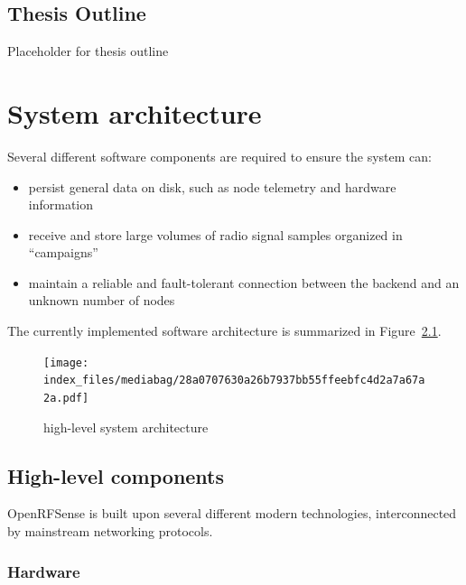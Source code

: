 \documentclass[
  letterpaper,
  a4paper,
  12pt,
  titlepage,
  oneside,
  openany]{book}
\providecommand{\tightlist}{%
  \setlength{\itemsep}{0pt}\setlength{\parskip}{0pt}}\usepackage{longtable,booktabs,array}
\begin{document}
\hypertarget{thesis-outline}{%
\section{Thesis Outline}\label{thesis-outline}}

Placeholder for thesis outline


\hypertarget{system-architecture}{%
\chapter{System architecture}\label{system-architecture}}

Several different software components are required to ensure the system
can:

\begin{itemize}
\tightlist
\item
  persist general data on disk, such as node telemetry and hardware
  information
\item
  receive and store large volumes of radio signal samples organized in
  \enquote{campaigns}
\item
  maintain a reliable and fault-tolerant connection between the backend
  and an unknown number of nodes
\end{itemize}

The currently implemented software architecture is summarized in
Figure~\ref{fig-systemArch}.

\begin{figure}[h!]

{\centering \texttt{[image: index\_files/mediabag/28a0707630a26b7937bb55ffeebfc4d2a7a67a2a.pdf]}

}

\caption{\label{fig-systemArch}high-level system architecture}

\end{figure}

\hypertarget{high-level-components}{%
\section{High-level components}\label{high-level-components}}

OpenRFSense is built upon several different modern technologies,
interconnected by mainstream networking protocols.

\hypertarget{hardware}{%
\subsection{Hardware}\label{hardware}}
\end{document}
